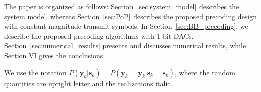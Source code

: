 \documentclass[journal,comsoc]{IEEEtran}
\begin{document}
The paper is organized as follows: Section~\ref{sec:system_model} describes the system model, whereas Section~\ref{sec:PoP} describes the proposed precoding design with constant magnitude transmit symbols. In Section~\ref{sec:BB_precoding}, we describe the proposed precoding algorithms with 1-bit DACs. Section~\ref{sec:numerical_results} presents and discusses numerical results, while Section VI gives the conclusions.

We use the notation $P(\boldsymbol{y}_k \vert \boldsymbol{s}_k)=P(\mathbf{y}_k=\boldsymbol{y}_k \vert \mathbf{s}_k=\boldsymbol{s}_k)$, where the random quantities are upright letter and the realizations italic.

%
\end{document}
